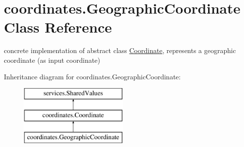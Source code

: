 \hypertarget{classcoordinates_1_1_geographic_coordinate}{}\section{coordinates.\+Geographic\+Coordinate Class Reference}
\label{classcoordinates_1_1_geographic_coordinate}


concrete implementation of abstract class \hyperlink{classcoordinates_1_1_coordinate}{Coordinate}, represents a geographic coordinate (as input coordinate)~\newline
  


Inheritance diagram for coordinates.\+Geographic\+Coordinate\+:\begin{figure}[H]
\begin{center}
\leavevmode
\includegraphics[height=3.000000cm]{classcoordinates_1_1_geographic_coordinate}
\end{center}
\end{figure}

